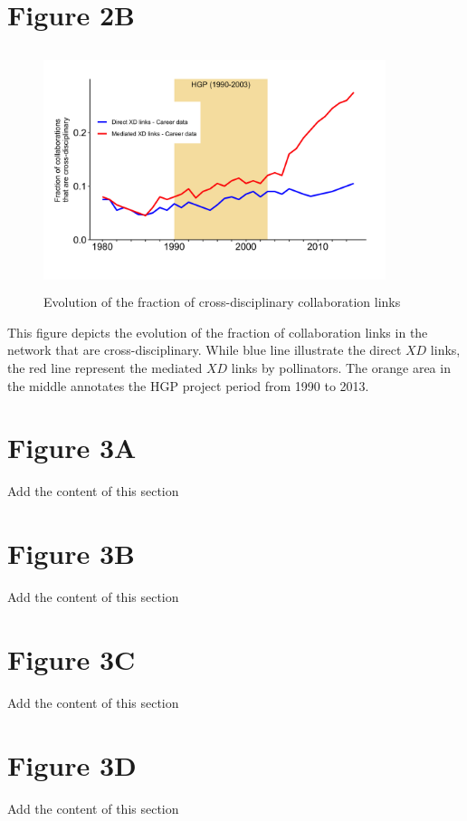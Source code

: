 \documentclass[10pt]{article}         %
\begin{document}
\newpage
\section{Figure 2B}
\begin{figure}[!htb]
  \centering
  \includegraphics[width=10cm, height=7cm]{Fig2B.png}
  \caption{Evolution of the fraction of cross-disciplinary collaboration links}
  \label{fig:2B}
\end{figure}

This figure depicts the evolution of the fraction of collaboration links in the network that are cross-disciplinary. While blue line illustrate the direct $XD$ links, the red line represent the mediated $XD$ links by pollinators. The orange area in the middle annotates the HGP project period from 1990 to 2013.

\newpage
\section{Figure 3A}
Add the content of this section

\newpage
\section{Figure 3B}
Add the content of this section

\newpage
\section{Figure 3C}
Add the content of this section

\newpage
\section{Figure 3D}
Add the content of this section
\end{document}
